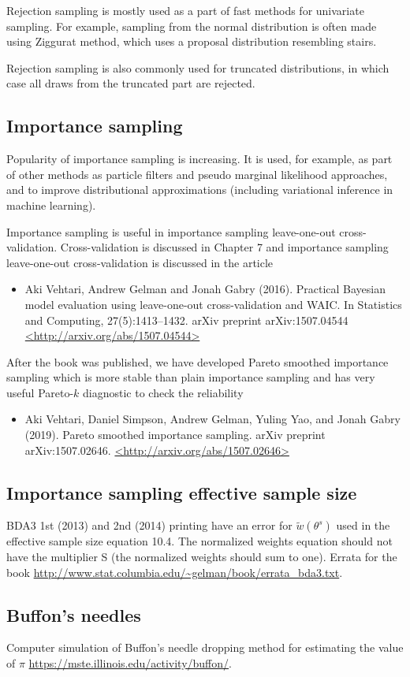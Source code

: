 \documentclass[a4paper,11pt,english]{article}
\begin{document}
 Rejection sampling is mostly used as a part of fast methods for
 univariate sampling. For example, sampling from the normal
 distribution is often made using Ziggurat method, which uses a
 proposal distribution resembling stairs.

 Rejection sampling is also commonly used for truncated distributions,
 in which case all draws from the truncated part are rejected.

 \subsection*{Importance sampling}

 Popularity of importance sampling is increasing. It is used, for
 example, as part of other methods as particle filters and pseudo
 marginal likelihood approaches, and to improve distributional
 approximations (including variational inference in machine learning).

 Importance sampling is useful in importance sampling leave-one-out
 cross-validation. Cross-validation is discussed in Chapter 7 and
 importance sampling leave-one-out cross-validation is discussed in
 the article
 \begin{itemize}
 \item Aki Vehtari, Andrew Gelman and Jonah Gabry (2016). Practical
   Bayesian model evaluation using leave-one-out cross-validation and
   WAIC. In Statistics and Computing, 27(5):1413--1432. arXiv preprint
   arXiv:1507.04544 \url{<http://arxiv.org/abs/1507.04544>}
 \end{itemize}

 After the book was published, we have developed Pareto smoothed
 importance sampling which is more stable than plain importance
 sampling and has very useful Pareto-$k$ diagnostic to check the
 reliability
\begin{itemize}
\item Aki Vehtari, Daniel Simpson, Andrew Gelman, Yuling Yao, and
  Jonah Gabry (2019). Pareto smoothed importance sampling. arXiv
  preprint arXiv:1507.02646. \url{<http://arxiv.org/abs/1507.02646>}
 \end{itemize}

 \subsection*{Importance sampling effective sample size}
 
 {\color{red} BDA3 1st (2013) and 2nd (2014) printing have an error
   for $\tilde{w}(\theta^s)$ used in the effective sample size
   equation 10.4. The normalized weights equation should not have the
   multiplier S (the normalized weights should sum to one). Errata for
   the book
   \url{http://www.stat.columbia.edu/~gelman/book/errata_bda3.txt}.}
 
 \subsection*{Buffon's needles}

 Computer simulation of Buffon's needle dropping method for estimating
 the value of $\pi$ \url{https://mste.illinois.edu/activity/buffon/}. 

 
\end{document}
